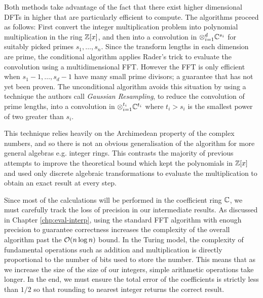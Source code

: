 Both methods take advantage of the fact that there exist higher dimensional DFTs in higher that are particularly efficient to compute. The algorithms proceed as follows: First convert the integer multiplication problem into polynomial multiplication in the ring ${\mathbb Z}[x]$, and then into a convolution in $\otimes_{i=1}^d {\mathbb C}^{s_i}$ for suitably picked primes $s_1, \ldots, s_n$. Since the transform lengths in each dimension are prime, the conditional algorithm applies Rader's trick to evaluate the convolution using a multidimensional FFT. However the FFT is only efficient when $s_1 - 1, \ldots, s_d - 1$ have many small prime divisors; a guarantee that has not yet been proven. The unconditional algorithm avoids this situation by using a technique the authors call \emph{Gaussian Resampling}, to reduce the convolution of prime lengths, into a convolution in $\otimes_{i=1}^{t_i} {\mathbb C}^{t_i}$ where $t_i > s_i$ is the smallest power of two greater than $s_i$.

This technique relies heavily on the Archimedean property of the complex numbers, and so there is not an obvious generalisation of the algorithm for more general algebras e.g. integer rings. This contrasts the majority of previous attempts to improve the theoretical bound which kept the polynomials in ${\mathbb Z}[x]$ and used only discrete algebraic transformations to evaluate the multiplication to obtain an exact result at every step.

Since most of the calculations will be performed in the coefficient ring ${\mathbb C}$, we must carefully track the loss of precision in our intermediate results. As discussed in Chapter \ref{chp:eval-interp}, using the standard FFT algorithm with enough precision to guarantee correctness increases the complexity of the overall algorithm past the $\mathcal O(n \log n)$ bound. In the Turing model, the complexity of fundamental operations such as addition and multiplication is directly proportional to the number of bits used to store the number. This means that as we increase the size of the size of our integers, simple arithmetic operations take longer. In the end, we must ensure the total error of the coefficients is strictly less than $1/2$ so that rounding to nearest integer returns the correct result. 


